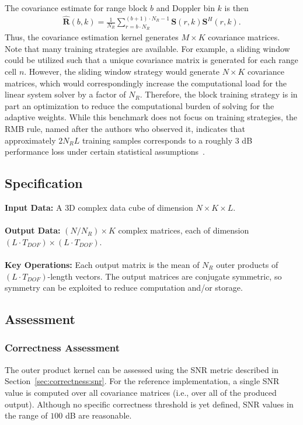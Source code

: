 \documentclass{report}
\begin{document}
The covariance estimate for range block $b$ and Doppler bin $k$ is then
\begin{align}
\hat{\mathbf{R}}(b,k) = \frac{1}{N_R} \sum_{r=b \cdot N_R}^{(b+1)\cdot N_R-1} {\mathbf{S}(r,k) \mathbf{S}^H(r,k)}.
\end{align}
Thus, the covariance estimation kernel generates $M \times K$
covariance matrices.
Note that many training strategies are available.
For example, a sliding window could be utilized such that
a unique covariance matrix is generated for each range cell $n$.
However, the sliding window strategy would generate
$N \times K$ covariance matrices, which would correspondingly
increase the computational load for the linear system solver
by a factor of $N_R$.
Therefore, the block training strategy is in part an optimization
to reduce the computational burden of solving for the adaptive weights.
While this benchmark does not focus on training strategies, the
RMB rule, named after the authors who observed it, indicates that
approximately $2 N_R L$ training samples corresponds to a roughly
3 dB performance loss under certain statistical assumptions~\cite{Reed1974}.

\subsection{Specification}
\label{sec:stap:cov_generation:spec}

\textbf{Input Data:} A {3D} complex data cube of dimension $N \times K \times L$. \\ \\
\textbf{Output Data:} $(N/N_R) \times K$ complex matrices, each of dimension
$(L \cdot T_{DOF}) \times (L \cdot T_{DOF})$. \\ \\
\textbf{Key Operations:} Each output matrix is the mean of $N_R$ outer products
of $(L \cdot T_{DOF})$-length vectors.  The output matrices are conjugate
symmetric, so symmetry can be exploited to reduce computation and/or storage.

\subsection{Assessment}

\subsubsection{Correctness Assessment}

The outer product kernel can be assessed using the SNR metric described
in Section~\ref{sec:correctness:snr}.
For the reference implementation, a single SNR value is computed over all
covariance matrices (i.e., over all of the produced output).
Although no specific correctness threshold is yet defined, SNR values in the
range of $100$ dB are reasonable.
\end{document}
